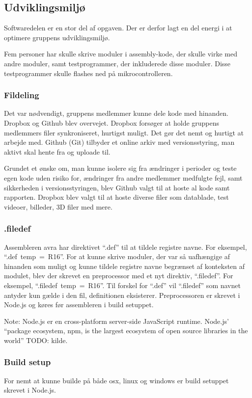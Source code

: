 \subsection{Udviklingsmiljø}

Softwaredelen er en stor del af opgaven. Der er derfor lagt en del energi i at optimere gruppens udviklingsmiljø.

Fem personer har skulle skrive moduler i assembly-kode, der skulle virke med andre moduler, samt testprogrammer, der inkluderede disse moduler. Disse testprogrammer skulle flashes ned på mikrocontrolleren.

\subsubsection{Fildeling}
Det var nødvendigt, gruppens medlemmer kunne dele kode med hinanden. Dropbox og Github blev overvejet.
Dropbox forsøger at holde gruppens medlemmers filer synkroniseret, hurtigst muligt.
Det gør det nemt og hurtigt at arbejde med.
Github (Git) tilbyder et online arkiv med versionsstyring, man aktivt skal hente fra og uploade til.

Grundet et ønske om, man kunne isolere sig fra ændringer i perioder og teste egen kode uden risiko for, ændringer fra andre medlemmer medfulgte fejl, samt sikkerheden i versionsstyringen, blev Github valgt til at hoste al kode samt rapporten.
Dropbox blev valgt til at hoste diverse filer som datablade, test videoer, billeder, 3D filer med mere.

\subsubsection{.filedef}
Assembleren avra har direktivet \mbox{``.def''} til at tildele registre navne. For eksempel, \mbox{``.def temp = R16''}.
For at kunne skrive moduler, der var så uafhængige af hinanden som muligt og kunne tildele registre navne begrænset af konteksten af modulet, blev der skrevet en preprocessor med et nyt direktiv, \mbox{``.filedef''}. For eksempel, \mbox{``.filedef temp = R16''}. Til forskel for \mbox{``.def''} vil \mbox{``.filedef''} som navnet antyder kun gælde i den fil, definitionen eksisterer. Preprocessoren er skrevet i Node.js og køres før assembleren i build setuppet.

\begin{mdquote}
	Note: Node.js er en cross-platform server-side JavaScript runtime. Node.js' ``package ecosystem, npm, is the largest ecosystem of open source libraries in the world'' TODO: kilde.
\end{mdquote}

\subsubsection{Build setup}
For nemt at kunne builde på både osx, linux og windows er build setuppet skrevet i Node.js.
